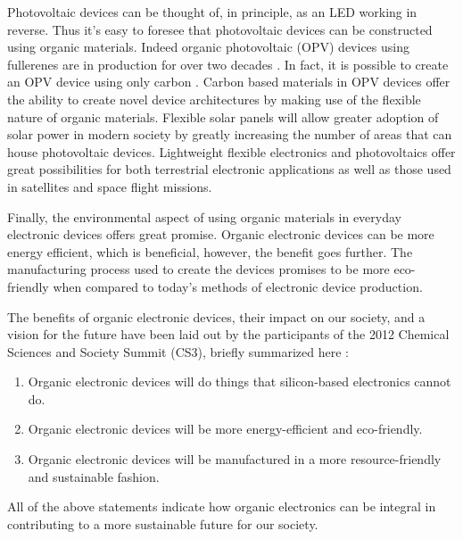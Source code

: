 Photovoltaic devices can be thought of, in principle, as an LED working in reverse. Thus it's easy to foresee that photovoltaic devices can be constructed using organic materials. Indeed organic photovoltaic (OPV) devices using fullerenes are in production for over two decades \cite{all-carbon}. In fact, it is possible to create an OPV device using only carbon \cite{all-carbon}. Carbon based materials in OPV devices offer the ability to create novel device architectures by making use of the flexible nature of organic materials. Flexible solar panels will allow greater adoption of solar power in modern society by greatly increasing the number of areas that can house photovoltaic devices. Lightweight flexible electronics and photovoltaics offer great possibilities for both terrestrial electronic applications as well as those used in satellites and space flight missions.

Finally, the environmental aspect of using organic materials in everyday electronic devices offers great promise. Organic electronic devices can be more energy efficient, which is beneficial, however, the benefit goes further. The manufacturing process used to create the devices promises to be more eco-friendly when compared to today's methods of electronic device production.

The benefits of organic electronic devices, their impact on our society, and a vision for the future have been laid out by the participants of the 2012 Chemical Sciences and Society Summit (CS3), briefly summarized here \cite{cs3}:
\begin{enumerate}
\item
Organic electronic devices will do things that silicon-based electronics cannot do.

\item
Organic electronic devices will be more energy-efficient and eco-friendly.

\item
Organic electronic devices will be manufactured in a more resource-friendly and sustainable fashion.
\end{enumerate}
All of the above statements indicate how organic electronics can be integral in contributing to a more sustainable future for our society.

